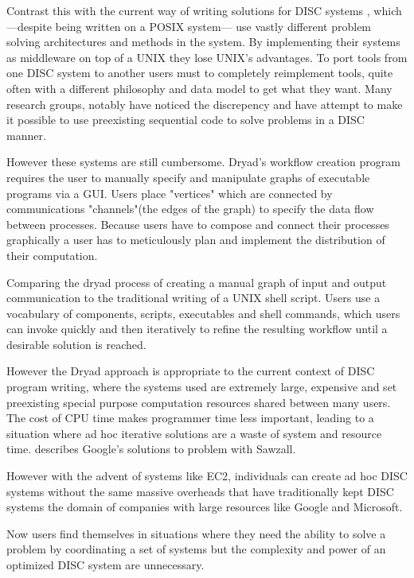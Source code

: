 \documentclass[10pt,conference,letterpaper]{IEEEtran}
\begin{document}
Contrast this with the current way of writing solutions for DISC systems , which ---despite being written on a POSIX system--- use vastly different problem solving architectures and methods in the system. By implementing their systems as middleware on top of a UNIX they lose UNIX's advantages.  To port tools from one DISC system to another users must to completely reimplement tools, quite often with a different philosophy and data model to get what they want. Many research groups, notably \cite{isard2007ddd} have noticed the discrepency and have attempt to make it possible to use preexisting sequential code to solve problems in a DISC manner.

However these systems are still cumbersome. Dryad's workflow creation program requires the user to manually specify and manipulate graphs of executable programs via a GUI. Users place "vertices" which are connected by communications "channels"(the edges of the graph) to specify the data flow between processes. Because users have to compose and connect their processes graphically a user has to meticulously plan and implement the distribution of their computation.

Comparing the dryad process of creating a manual graph of input and output communication to the traditional writing of a UNIX shell script. Users use a vocabulary of components, scripts, executables and shell commands, which users can invoke quickly and then iteratively to refine the resulting workflow until a desirable solution is reached.

However the Dryad approach is appropriate to the current context of DISC program writing, where the systems used are extremely large, expensive and set preexisting special purpose computation resources shared between many users. The cost of CPU time makes programmer time less important, leading to a situation where ad hoc iterative solutions are a waste of system and resource time. \cite{pike2005idp} describes Google's solutions to problem with Sawzall.

However with the advent of systems like EC2\cite{amazon:aec}, individuals can create ad hoc DISC systems without the same massive overheads that have traditionally kept DISC systems the domain of companies with large resources like Google and Microsoft.

Now users find themselves in situations where they need the ability to solve a problem by coordinating a set of systems but the complexity and power of an optimized DISC system are unnecessary. 
\end{document}

